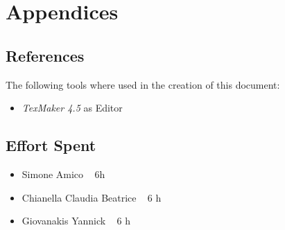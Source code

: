 \documentclass[12pt]{article}
\begin{document}
	
	
			
	\section{Appendices}
		\subsection{References}
		The following tools where used in the creation of this document:
		\begin{itemize}
		\item \emph{TexMaker 4.5} as Editor
		
		\end{itemize}
		
		\subsection{Effort Spent}
		\begin{itemize}
		\item Simone Amico ~  6h
		\item Chianella Claudia Beatrice ~ 6 h
		\item Giovanakis Yannick ~ 6 h
		\end{itemize}
\end{document}
